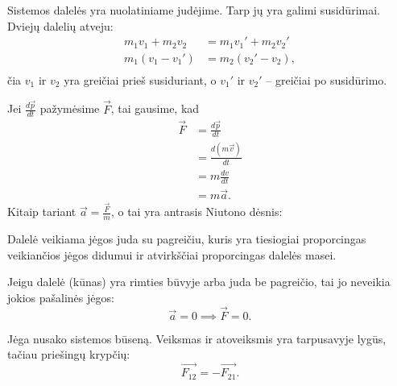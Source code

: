 Sistemos dalelės yra nuolatiniame judėjime. Tarp jų yra galimi
susidūrimai. Dviejų dalelių atveju:
\begin{align*}
  m_{1}v_{1} + m_{2}v_{2} &= m_{1}v_{1}' + m_{2}v_{2}' \\
  m_{1}(v_{1}-v_{1}') &= m_{2}(v_{2}' - v_{2}), \\
\end{align*}
čia $v_{1}$ ir $v_{2}$ yra greičiai prieš susiduriant, o
$v_{1}'$ ir $v_{2}'$ – greičiai po susidūrimo.

Jei $\frac{d\vec{p}}{dt}$ pažymėsime $\vec{F}$, tai gausime, kad
\begin{align*}
  \vec{F}
  &= \frac{d\vec{p}}{dt} \\
  &= \frac{d(m\vec{v})}{dt} \\
  &= m \frac{dv}{dt} \\
  &= m\vec{a}.
\end{align*}
Kitaip tariant $\vec{a} = \frac{\vec{F}}{m}$, o tai yra antrasis
Niutono dėsnis:
\begin{defn}
  Dalelė veikiama jėgos juda su pagreičiu, kuris yra tiesiogiai
  proporcingas veikiančios jėgos didumui ir atvirkščiai proporcingas
  dalelės masei.
\end{defn}

\begin{defn}
  Jeigu dalelė (kūnas) yra rimties būvyje arba juda be pagreičio, tai
  jo neveikia jokios pašalinės jėgos:
  \begin{equation*}
    \vec{a} = 0 \implies \vec{F} = 0.
  \end{equation*}
\end{defn}

\begin{defn}
  Jėga nusako sistemos būseną. Veiksmas ir atoveiksmis yra tarpusavyje
  lygūs, tačiau priešingų krypčių:
  \begin{equation*}
    \vec{F_{12}} = -\vec{F_{21}}.
  \end{equation*}
\end{defn}

